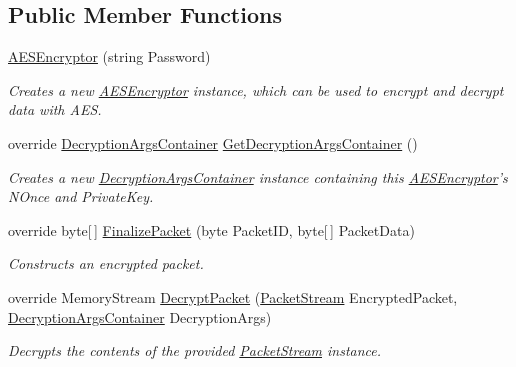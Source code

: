 \subsection*{Public Member Functions}
\begin{DoxyCompactItemize}
\item 
\hyperlink{class_gonzo_net_1_1_encryption_1_1_a_e_s_encryptor_a9202df9d6913beb8bf6d6454837e7173}{A\+E\+S\+Encryptor} (string Password)
\begin{DoxyCompactList}\small\item\em Creates a new \hyperlink{class_gonzo_net_1_1_encryption_1_1_a_e_s_encryptor}{A\+E\+S\+Encryptor} instance, which can be used to encrypt and decrypt data with A\+E\+S. \end{DoxyCompactList}\item 
override \hyperlink{class_gonzo_net_1_1_encryption_1_1_decryption_args_container}{Decryption\+Args\+Container} \hyperlink{class_gonzo_net_1_1_encryption_1_1_a_e_s_encryptor_a8765b6fdc563387e8a75370f5e6b3982}{Get\+Decryption\+Args\+Container} ()
\begin{DoxyCompactList}\small\item\em Creates a new \hyperlink{class_gonzo_net_1_1_encryption_1_1_decryption_args_container}{Decryption\+Args\+Container} instance containing this \hyperlink{class_gonzo_net_1_1_encryption_1_1_a_e_s_encryptor}{A\+E\+S\+Encryptor}'s N\+Once and Private\+Key. \end{DoxyCompactList}\item 
override byte\mbox{[}$\,$\mbox{]} \hyperlink{class_gonzo_net_1_1_encryption_1_1_a_e_s_encryptor_ab5c0976f43de8e6126190463b69b2d5b}{Finalize\+Packet} (byte Packet\+I\+D, byte\mbox{[}$\,$\mbox{]} Packet\+Data)
\begin{DoxyCompactList}\small\item\em Constructs an encrypted packet. \end{DoxyCompactList}\item 
override Memory\+Stream \hyperlink{class_gonzo_net_1_1_encryption_1_1_a_e_s_encryptor_aa7b4e2ac1ae020fbafe4ecb2c1b900ae}{Decrypt\+Packet} (\hyperlink{class_gonzo_net_1_1_packet_stream}{Packet\+Stream} Encrypted\+Packet, \hyperlink{class_gonzo_net_1_1_encryption_1_1_decryption_args_container}{Decryption\+Args\+Container} Decryption\+Args)
\begin{DoxyCompactList}\small\item\em Decrypts the contents of the provided \hyperlink{class_gonzo_net_1_1_packet_stream}{Packet\+Stream} instance. \end{DoxyCompactList}\end{DoxyCompactItemize}
